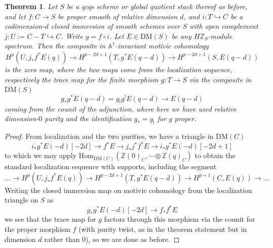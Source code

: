 \documentclass[a4paper,reqno,11pt]{amsart}
\theoremstyle{plain}
\newtheorem{theorem}{Theorem}[section]
\theoremstyle{definition}
\theoremstyle{remark}
\newcommand{\Z}{\mathbb{Z}}
\newcommand{\A}{\mathbb{A}}
\newcommand{\DM}{\mathrm{DM}}
\newcommand{\Hom}{\mathrm{Hom}}
\begin{document}
\begin{theorem}\label{thm:main}
    Let $S$ be a qcqs scheme or global quotient stack thereof as before, and let $f:C\to S$ be proper smooth of relative dimension $d$, and $i:T\hookrightarrow C$ be a codimension-$d$ closed immersion of smooth schemes over $S$ with open complement $j:U:=C-T\hookrightarrow C$. Write $g= f\circ i$. Let $E\in \DM(S)$ be any $H\Z_S$-module spectrum. Then the composite in $\A^1$-invariant motivic cohomology
    \[
    H^p(U,j_*f^*E(q))\to H^{p-2d+1}(T,g^*E(q-d))\to  H^{p-2d+1}(S,E(q-d))
    \]
    is the zero map, where the two maps come from the localization sequence, respectively the trace map for the finite morphism $g:T\to S$ via the composite in $\DM(S)$
    \[
     g_*g^* E(q-d)=g_!g^!E(q-d) \to E(q-d)
    \]
    coming from the counit of the adjunction, where here we have used relative dimension-$0$ purity and the identification $g_*=g_!$ for $g$ proper.
\end{theorem}
\begin{proof}
    From localization and the two purities, we have a triangle in $\DM(C)$
    \[
    i_*g^*E(-d)[-2d] \to f^* E \to j_* j^* f^* E \to i_*g^*E(-d)[-2d+1]
    \]
    to which we may apply $\Hom_{\DM(C)}( \Z(0)_C,- \otimes \Z(q)_C)$ to obtain the standard localization sequence with supports, including the segment 
    \[
    \ldots \to H^p(U,j_*f^*E(q))\to H^{p-2d+1}(T,g^*E(q-d))\to  H^{p+1}(C,E(q)) \to \ldots
    \]
    Writing the closed immersion map on motivic cohomology from the localization triangle on $S$ as
    \[
        g_*g^* E(-d)[-2d] \to f_*f^*E
    \]
    we see that the trace map for $g$ factors through this morphism via the counit for the proper morphism $f$ (with purity twist, as in the theorem statement but in dimension $d$ rather than $0$), so we are done as before.
\end{proof}
    
\end{document}
